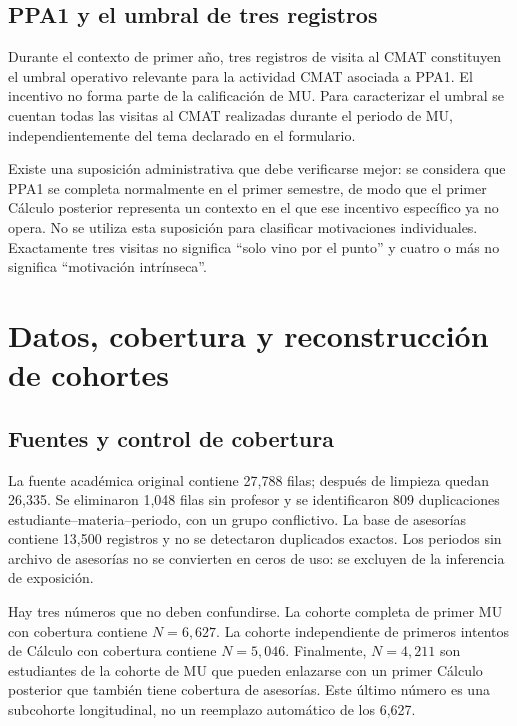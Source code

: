 \documentclass[11pt,letterpaper]{article}
\begin{document}
\subsection{PPA1 y el umbral de tres registros}

Durante el contexto de primer año, tres registros de visita al CMAT constituyen el umbral operativo relevante para la actividad CMAT asociada a PPA1. El incentivo no forma parte de la calificación de MU. Para caracterizar el umbral se cuentan todas las visitas al CMAT realizadas durante el periodo de MU, independientemente del tema declarado en el formulario.

Existe una suposición administrativa que debe verificarse mejor: se considera que PPA1 se completa normalmente en el primer semestre, de modo que el primer Cálculo posterior representa un contexto en el que ese incentivo específico ya no opera. No se utiliza esta suposición para clasificar motivaciones individuales. Exactamente tres visitas no significa ``solo vino por el punto'' y cuatro o más no significa ``motivación intrínseca''.

\section{Datos, cobertura y reconstrucción de cohortes}

\subsection{Fuentes y control de cobertura}

La fuente académica original contiene 27,788 filas; después de limpieza quedan 26,335. Se eliminaron 1,048 filas sin profesor y se identificaron 809 duplicaciones estudiante--materia--periodo, con un grupo conflictivo. La base de asesorías contiene 13,500 registros y no se detectaron duplicados exactos. Los periodos sin archivo de asesorías no se convierten en ceros de uso: se excluyen de la inferencia de exposición.

\begin{table}[H]
\centering
\caption{Flujo de cohortes del pipeline actual}

\end{table}

Hay tres números que no deben confundirse. La cohorte completa de primer MU con cobertura contiene $N=6{,}627$. La cohorte independiente de primeros intentos de Cálculo con cobertura contiene $N=5{,}046$. Finalmente, $N=4{,}211$ son estudiantes de la cohorte de MU que pueden enlazarse con un primer Cálculo posterior que también tiene cobertura de asesorías. Este último número es una subcohorte longitudinal, no un reemplazo automático de los 6,627.
\end{document}

